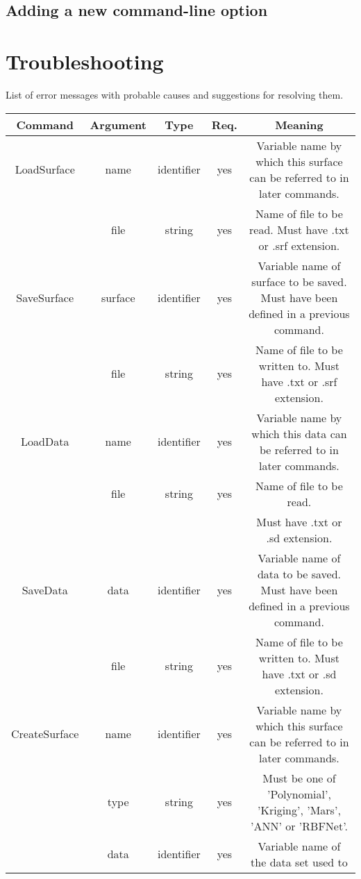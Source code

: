 \documentclass{article}
\begin{document}
\subsection{Adding a new command-line option}

\section{Troubleshooting}
List of error messages with probable causes and suggestions for resolving them.

\appendix

\begin{sidewaystable}[h]
  \centering
  \begin{tabular}{|c|c|c|c|c|}
    \hline
    \textbf{Command} & \textbf{Argument} & \textbf{Type} &
    \textbf{Req.} & \textbf{Meaning}\\
    \hline
    LoadSurface & name & identifier & yes & Variable name by which
    this surface can be referred to in later commands.\\
    \hline
    & file & string & yes & Name of file to be read.  Must have .txt
    or .srf extension.\\
    \hline
    SaveSurface & surface & identifier & yes & Variable name of
    surface to be saved.  Must have been defined in a previous
    command.\\
    \hline
    & file & string & yes & Name of file to be written to.  Must have .txt
    or .srf extension.\\
    \hline
    LoadData & name & identifier & yes & Variable name by which this
    data can be referred to in later commands.\\
    \hline
    & file & string & yes & Name of file to be read.\\
    & & & & Must have .txt or .sd extension.\\
    \hline
    SaveData & data & identifier & yes & Variable name of data to be
    saved.  Must have been defined in a previous command.\\
    \hline
    & file & string & yes & Name of file to be written to.  Must have
    .txt or .sd extension.\\
    \hline
    CreateSurface & name & identifier & yes & Variable name by which
    this surface can be referred to in later commands.\\
    \hline
    & type & string & yes & Must be one of 'Polynomial', 'Kriging',
    'Mars', 'ANN' or 'RBFNet'.\\
    \hline
    & data & identifier & yes & Variable name of the data set used to

\end{tabular}
\end{sidewaystable}
\end{document}
